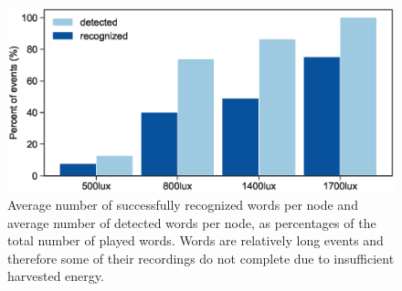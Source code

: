 %
\begin{figure}
\centering
\includegraphics[width=\linewidth]{figures/detection_vs_recognition}
\caption{
Average number of successfully recognized words per node and average number of detected words per node, as percentages of the total number of played words. Words are relatively long events and therefore some of their recordings do not complete due to insufficient harvested energy.}
\label{fig:word_freq}
\end{figure}






